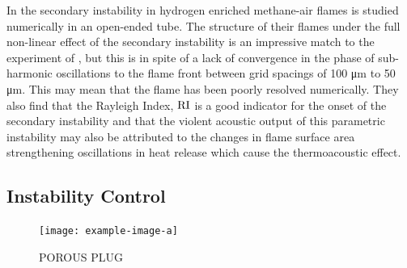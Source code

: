 In \cite{jun2023ParametricInstabilityPropagating} the secondary instability in hydrogen enriched methane-air flames is studied numerically in an open-ended tube. The structure of their flames under the full non-linear effect of the secondary instability is an impressive match to the experiment of \cite{ebieto2017DynamicsPremixedFlames}, but this is in spite of a lack of convergence in the phase of sub-harmonic oscillations to the flame front between grid spacings of 100 μm to 50 μm. This may mean that the flame has been poorly resolved numerically. They also find that the Rayleigh Index, $\rm{RI}$ is a good indicator for the onset of the secondary instability and that the violent acoustic output of this parametric instability may also be attributed to the changes in flame surface area strengthening oscillations in heat release which cause the thermoacoustic effect.





\subsection{Instability Control}


\begin{figure}[t]
\centering
\texttt{[image: example-image-a]}
\caption{POROUS PLUG}
\label{fig:porous-plug}
\end{figure}

